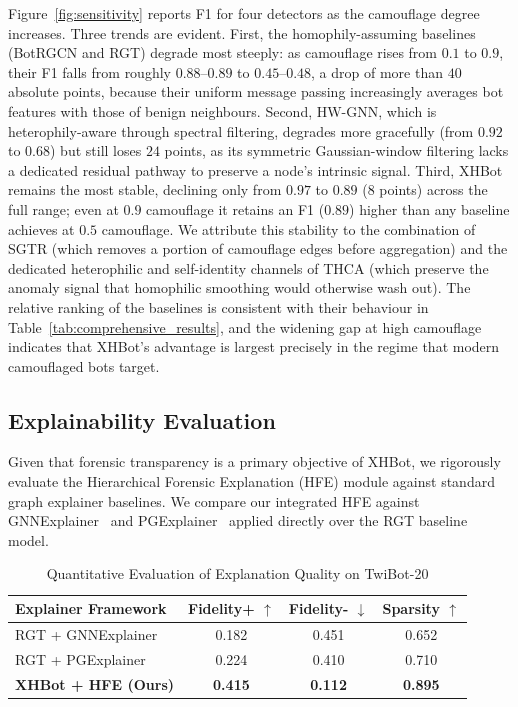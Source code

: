 Figure~\ref{fig:sensitivity} reports F1 for four detectors as the camouflage degree increases. Three trends are evident. First, the homophily-assuming baselines (BotRGCN and RGT) degrade most steeply: as camouflage rises from $0.1$ to $0.9$, their F1 falls from roughly $0.88$--$0.89$ to $0.45$--$0.48$, a drop of more than $40$ absolute points, because their uniform message passing increasingly averages bot features with those of benign neighbours. Second, HW-GNN, which is heterophily-aware through spectral filtering, degrades more gracefully (from $0.92$ to $0.68$) but still loses $24$ points, as its symmetric Gaussian-window filtering lacks a dedicated residual pathway to preserve a node's intrinsic signal. Third, XHBot remains the most stable, declining only from $0.97$ to $0.89$ ($8$ points) across the full range; even at $0.9$ camouflage it retains an F1 ($0.89$) higher than any baseline achieves at $0.5$ camouflage. We attribute this stability to the combination of SGTR (which removes a portion of camouflage edges before aggregation) and the dedicated heterophilic and self-identity channels of THCA (which preserve the anomaly signal that homophilic smoothing would otherwise wash out). The relative ranking of the baselines is consistent with their behaviour in Table~\ref{tab:comprehensive_results}, and the widening gap at high camouflage indicates that XHBot's advantage is largest precisely in the regime that modern camouflaged bots target.

\subsection{Explainability Evaluation}

Given that forensic transparency is a primary objective of XHBot, we rigorously evaluate the Hierarchical Forensic Explanation (HFE) module against standard graph explainer baselines. We compare our integrated HFE against GNNExplainer~\cite{ying2019gnnexplainer} and PGExplainer~\cite{luo2020pgexplainer} applied directly over the RGT baseline model.

\begin{table}[h]
\centering
\caption{Quantitative Evaluation of Explanation Quality on TwiBot-20}
\label{tab:explainability}
\begin{tabular}{lccc}
\toprule
\textbf{Explainer Framework} & \textbf{Fidelity+} $\uparrow$ & \textbf{Fidelity-} $\downarrow$ & \textbf{Sparsity} $\uparrow$ \\
\midrule
RGT + GNNExplainer & 0.182 & 0.451 & 0.652 \\
RGT + PGExplainer & 0.224 & 0.410 & 0.710 \\
\midrule
\textbf{XHBot + HFE (Ours)} & \textbf{0.415} & \textbf{0.112} & \textbf{0.895} \\
\bottomrule
\end{tabular}
\end{table}

